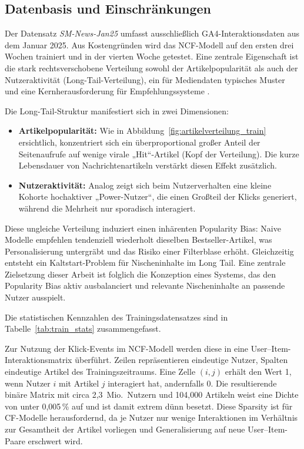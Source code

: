 \subsection{Datenbasis und Einschränkungen}
\label{sec:data}
Der Datensatz \textit{SM-News-Jan25} umfasst ausschließlich \ac{GA4}-Interaktionsdaten aus dem Januar 2025. Aus Kostengründen wird das NCF-Modell auf den ersten drei Wochen trainiert und in der vierten Woche getestet. Eine zentrale Eigenschaft ist die stark rechtsverschobene Verteilung sowohl der Artikelpopularität als auch der Nutzeraktivität (Long-Tail-Verteilung), ein für Mediendaten typisches Muster und eine Kernherausforderung für Empfehlungssysteme \cite{wu_personalized_2022, raza_news_2020}.


Die Long-Tail-Struktur manifestiert sich in zwei Dimensionen:
\begin{itemize}
    \item \textbf{Artikelpopularität:} Wie in Abbildung~\ref{fig:artikelverteilung_train} ersichtlich, konzentriert sich ein \newline überproportional großer Anteil der Seitenaufrufe auf wenige virale „Hit“-Artikel (Kopf der Verteilung). Die kurze Lebensdauer von Nachrichtenartikeln verstärkt diesen Effekt zusätzlich.
    \item \textbf{Nutzeraktivität:} Analog zeigt sich beim Nutzerverhalten eine kleine Kohorte hochaktiver „Power-Nutzer“, die einen Großteil der Klicks generiert, während die Mehrheit nur sporadisch interagiert.
\end{itemize}
Diese ungleiche Verteilung induziert einen inhärenten Popularity Bias: Naive Modelle empfehlen tendenziell wiederholt dieselben Bestseller-Artikel, was Personalisierung untergräbt und das Risiko einer Filterblase erhöht. Gleichzeitig entsteht ein Kaltstart-Problem für Nischeninhalte im Long Tail. Eine zentrale Zielsetzung dieser Arbeit ist folglich die Konzeption eines Systems, das den Popularity Bias aktiv ausbalanciert und relevante Nischeninhalte an passende Nutzer ausspielt.


Die statistischen Kennzahlen des Trainingsdatensatzes sind in Tabelle~\ref{tab:train_stats} zusammengefasst.

\label{tab:train_stats}

Zur Nutzung der Klick-Events im \ac{NCF}-Modell werden diese in eine \newline User–Item-Interaktionsmatrix überführt. Zeilen repräsentieren eindeutige Nutzer, Spalten eindeutige Artikel des Trainingszeitraums. Eine Zelle $(i,j)$ erhält den Wert 1, wenn Nutzer $i$ mit Artikel $j$ interagiert hat, andernfalls 0. Die resultierende binäre Matrix mit circa 2{,}3~Mio.\ Nutzern und 104{,}000 Artikeln weist eine Dichte von unter 0{,}005\,\% auf und ist damit extrem dünn besetzt. Diese Sparsity ist für \ac{CF}-Modelle herausfordernd, da je Nutzer nur wenige Interaktionen im Verhältnis zur Gesamtheit der Artikel vorliegen und Generalisierung auf neue User–Item-Paare erschwert wird.

